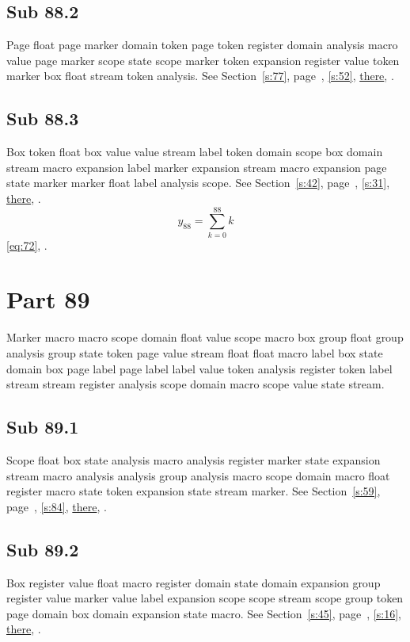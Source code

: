 \documentclass[11pt]{article}
\begin{document}
\subsection{Sub 88.2}\label{ss:88.2} Page float page marker domain token page token register domain analysis macro value page marker scope state scope marker token expansion register value token marker box float stream token analysis. See Section~\ref{s:77}, page~\pageref{ss:73.2}, \cref{s:52}, \hyperref[s:47]{there}, \cite{k103,k70}.
\subsection{Sub 88.3}\label{ss:88.3} Box token float box value value stream label token domain scope box domain stream macro expansion label marker expansion stream macro expansion page state marker marker float label analysis scope. See Section~\ref{s:42}, page~\pageref{ss:92.3}, \cref{s:31}, \hyperref[s:89]{there}, \cite{k27,k13}.
\begin{equation}y_{88}=\sum_{k=0}^{88}k\label{eq:88}\end{equation} \eqref{eq:72}, .
\section{Part 89}\label{s:89}
Marker macro macro scope domain float value scope macro box group float group analysis group state token page value stream float float macro label box state domain box page label page label label value token analysis register token label stream stream register analysis scope domain macro scope value state stream.
\subsection{Sub 89.1}\label{ss:89.1} Scope float box state analysis macro analysis register marker state expansion stream macro analysis analysis group analysis macro scope domain macro float register macro state token expansion state stream marker. See Section~\ref{s:59}, page~\pageref{ss:54.2}, \cref{s:84}, \hyperref[s:36]{there}, \cite{k88,k62}.
\subsection{Sub 89.2}\label{ss:89.2} Box register value float macro register domain state domain expansion group register value marker value label expansion scope scope stream scope group token page domain box domain expansion state macro. See Section~\ref{s:45}, page~\pageref{ss:95.1}, \cref{s:16}, \hyperref[s:78]{there}, \cite{k74,k63}.
\end{document}
